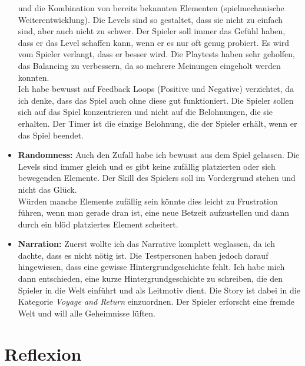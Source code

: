 \documentclass{article}
\begin{document}
\begin{itemize}
    und die Kombination von bereits bekannten Elementen (spielmechanische Weiterentwicklung). Die Levels sind so gestaltet, dass sie nicht zu einfach sind, aber auch nicht zu schwer. Der Spieler soll immer das Gefühl haben, dass er
    das Level schaffen kann, wenn er es nur oft genug probiert. Es wird vom Spieler verlangt, dass er besser wird. Die Playtests haben sehr geholfen, das Balancing zu verbessern, da so mehrere Meinungen
    eingeholt werden konnten. \\
    Ich habe bewusst auf Feedback Loops (Positive und Negative) verzichtet, da ich denke, dass das Spiel auch ohne diese gut funktioniert. Die Spieler sollen sich auf das Spiel konzentrieren und nicht auf die
    Belohnungen, die sie erhalten. Der Timer ist die einzige Belohnung, die der Spieler erhält, wenn er das Spiel beendet.
    \item \textbf{Randomness:} Auch den Zufall habe ich bewusst aus dem Spiel gelassen. Die Levels sind immer gleich und es gibt keine zufällig platzierten oder sich bewegenden Elemente.
    Der Skill des Spielers soll im Vordergrund stehen und nicht das Glück. \\
    Würden manche Elemente zufällig sein könnte dies leicht zu Frustration führen, wenn man gerade dran ist, eine neue Betzeit aufzustellen und dann durch ein blöd platziertes Element scheitert.
    \item \textbf{Narration:} Zuerst wollte ich das Narrative komplett weglassen, da ich dachte, dass es nicht nötig ist. Die Testpersonen haben jedoch darauf hingewiesen, dass eine gewisse Hintergrundgeschichte
    fehlt. Ich habe mich dann entschieden, eine kurze Hintergrundgeschichte zu schreiben, die den Spieler in die Welt einführt und als Leitmotiv dient. Die Story ist dabei in die Kategorie \textit{Voyage and Return}
    einzuordnen. Der Spieler erforscht eine fremde Welt und will alle Geheimnisse lüften.
\end{itemize}

\newpage
\section{Reflexion}
\end{document}

